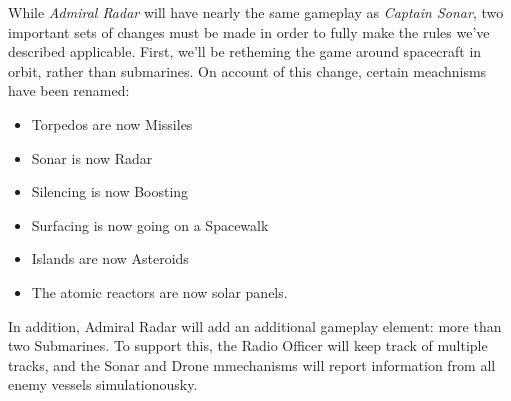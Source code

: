 While \textit{Admiral Radar} will have nearly the same gameplay as \textit{Captain Sonar}, two important sets of changes must be made in order to fully make the rules we've described applicable. First, we'll be retheming the game around spacecraft in orbit, rather than submarines. On account of this change, certain meachnisms have been renamed:

\begin{itemize}
\item Torpedos are now Missiles
\item Sonar is now Radar
\item Silencing is now Boosting
\item Surfacing is now going on a Spacewalk
\item Islands are now Asteroids
\item The atomic reactors are now solar panels.
\end{itemize}

In addition, Admiral Radar will add an additional gameplay element: more than two Submarines. To support this, the Radio Officer will keep track of multiple tracks, and the Sonar and Drone mmechanisms will report information from all enemy vessels simulationousky. 